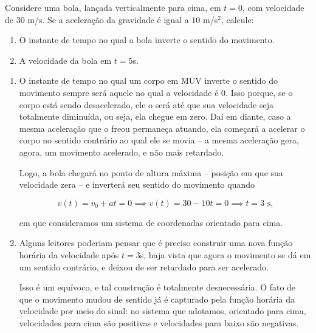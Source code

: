 \vspace{0.3cm}





\begin{exemplo}[Nível II]\label{exemplo_cinematicaescalar_funcaovelocidademuvex02}




Considere uma bola, lançada verticalmente para cima, em $t=0$, com velocidade de $30$ m/s. Se a aceleração da gravidade é igual a $10$ m/s$^2$, calcule:

\begin{enumerate}
    \item [(a)] O instante de tempo no qual a bola inverte o sentido do movimento.
    \item [(b)] A velocidade da bola em $t=5$s.
\end{enumerate}


\resolucao


\begin{enumerate}
    \item [(a)] O instante de tempo no qual um corpo em MUV inverte o sentido do movimento sempre será aquele no qual a velocidade é $0.$ Isso porque, se o corpo está sendo desacelerado, ele o será até que sua velocidade seja totalmente diminuída, ou seja, ela chegue em zero. Daí em diante, caso a mesma aceleração que o freou permaneça atuando, ela começará a acelerar o corpo no sentido contrário ao qual ele se movia -- a mesma aceleração gera, agora, um movimento acelerado, e não mais retardado.

    Logo, a bola chegará no ponto de altura máxima -- posição em que sua velocidade zera -- e inverterá seu sentido do movimento quando

    $$ v(t) = v_0+at =0\implies v(t) = 30-10t =0 \implies \boxed{t=3 \text{ s,}}  $$

    \noindent em que consideramos um sistema de coordenadas orientado para cima.


    
    \item [(b)] Alguns leitores poderiam pensar que é preciso construir uma nova função horária da velocidade após $t=3$s, haja vista que agora o movimento se dá em um sentido contrário, e deixou de ser retardado para ser acelerado.

    Isso é um equívoco, e tal construção é totalmente desnecessária. O fato de que o movimento mudou de sentido já é capturado pela função horária da velocidade por meio do sinal: no sistema que adotamos, orientado para cima, velocidades para cima são positivas e velocidades para baixo são negativas. 


\end{enumerate}
\end{exemplo}
